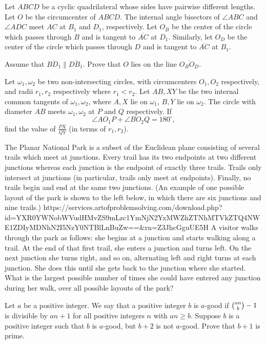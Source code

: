 \documentclass[11pt]{scrartcl}
\begin{document}
\begin{problem}[6025085618534905645]
	Let $ABCD$ be a cyclic quadrilateral whose sides have pairwise different lengths. Let $O$ be the circumcenter of $ABCD$. The internal angle bisectors of $\angle ABC$ and $\angle ADC$ meet $AC$ at $B_1$ and $D_1$, respectively. Let $O_B$ be the center of the circle which passes through $B$ and is tangent to $\overline{AC}$ at $D_1$. Similarly, let $O_D$ be the center of the circle which passes through $D$ and is tangent to $\overline{AC}$ at $B_1$.

Assume that $\overline{BD_1} \parallel \overline{DB_1}$. Prove that $O$ lies on the line $\overline{O_BO_D}$.
\end{problem}
\begin{problem}[689874125173032]
Let $\omega_1,\omega_2$ be two non-intersecting circles, with circumcenters $O_1,O_2$ respectively, and radii $r_1,r_2$ respectively where $r_1 < r_2$. Let $AB,XY$ be the two internal common tangents of $\omega_1,\omega_2$, where $A,X$ lie on $\omega_1$, $B,Y$ lie on $\omega_2$. The circle with diameter $AB$ meets $\omega_1,\omega_2$ at $P$ and $Q$ respectively. If$$\angle AO_1P+\angle BO_2Q=180^{\circ},$$find the value of $\frac{PX}{QY}$ (in terms of $r_1,r_2$).
\end{problem}
\begin{problem}[313143209359080]
The Planar National Park is a subset of the Euclidean plane consisting of several trails which meet at junctions. Every trail has its two endpoints at two different junctions whereas each junction is the endpoint of exactly three trails. Trails only intersect at junctions (in particular, trails only meet at endpoints). Finally, no trails begin and end at the same two junctions. (An example of one possible layout of the park is shown to the left below, in which there are six junctions and nine trails.)
https://services.artofproblemsolving.com/download.php?id=YXR0YWNobWVudHMvZS9mLzc1YmNjN2YxMWZhZTNhMTVkZTQ4NWE1ZDIyMDNhN2I5NzY0NTBlLnBuZw==&rn=Z3JhcGguUE5H
A visitor walks through the park as follows: she begins at a junction and starts walking along a trail. At the end of that first trail, she enters a junction and turns left. On the next junction she turns right, and so on, alternating left and right turns at each junction. She does this until she gets back to the junction where she started. What is the largest possible number of times she could have entered any junction during her walk, over all possible layouts of the park?
\end{problem}
\begin{problem}[1440964279096111130]
	Let $a$ be a positive integer. We say that a positive integer $b$ is $a$-good if $\tbinom{an}{b}-1$ is divisible by $an+1$ for all positive integers $n$ with $an \geq b$. Suppose $b$ is a positive integer such that $b$ is $a$-good, but $b+2$ is not $a$-good. Prove that $b+1$ is prime.
\end{problem}
\end{document}
